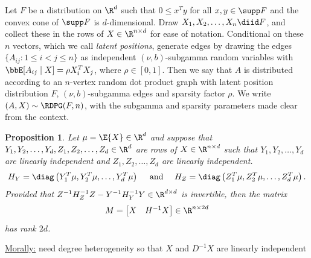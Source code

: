 \documentclass[aspectratio=169]{beamer}
\newtheorem{proposition}{Proposition}
\theoremstyle{remark}
\begin{document}
\begin{frame}

    \begin{definition}
        Let $F$ be a distribution on $\R^d$ such that $0 \le x^T y$ for all $x,y \in \supp F$ and the convex cone of $\supp F$ is $d$-dimensional.
        Draw $X_1,X_2,\dots,X_n \diid F$, and collect these in the rows of $X \in \R^{n \times d}$ for ease of notation.
        Conditional on these $n$ vectors, which we call {\em latent positions}, generate edges by drawing the edges $\{ A_{ij} : 1 \le i < j \le n \}$ as independent $(\nu,b)$-subgamma random variables with $\bbE[ A_{ij} \mid X ] = \rho X_i^T X_j$, where $\rho \in [0,1]$.
        Then we say that $A$ is distributed according to an $n$-vertex random dot product graph with latent position distribution $F$, $(\nu,b)$-subgamma edges and sparsity factor $\rho$.
        We write $(A,X) \sim \RDPG( F, n)$, with the subgamma and sparsity parameters made clear from the context.
    \end{definition}
\end{frame}

\begin{frame}
    \begin{proposition}
        \label{prop:XHX-rank}
        Let $\mu = \E{X} \in \R^d$ and suppose that $Y_1,Y_2,\dots,Y_d,Z_1,Z_2,\dots,Z_d \in \R^d$ are rows of $X \in \R^{n \times d}$ such that $Y_1,Y_2,\dots,Y_d$ are linearly independent and $Z_1,Z_2,\dots,Z_d$ are linearly independent.
        \begin{equation*}
            H_Y = \diag\left( Y_1^T \mu, Y_2^T \mu, \dots, Y_d^T \mu \right)
            ~~~\text{ and }~~~
            H_Z = \diag\left( Z_1^T \mu, Z_2^T \mu, \dots, Z_d^T \mu \right).
        \end{equation*}
        Provided that $Z^{-1} H_Z^{-1} Z - Y^{-1} H_Y^{-1} Y \in \R^{d \times d}$ is invertible, then the matrix
        \begin{equation*} \label{eq:targetmx}
            M = \begin{bmatrix} X & H^{-1} X \end{bmatrix} \in \R^{n \times 2d}
        \end{equation*}
        has rank $2d$.
    \end{proposition}
    
    \underline{Morally:} need degree heterogeneity so that $X$ and $D^{-1} X$ are linearly independent
\end{frame}
\end{document}
